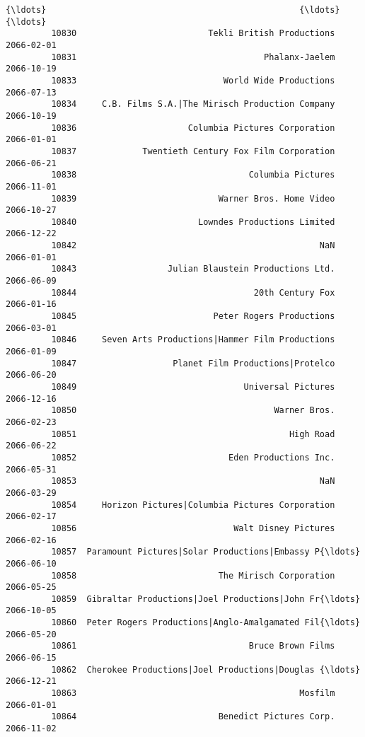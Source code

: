 \documentclass[11pt]{article}
\begin{document}
\begin{Verbatim}[commandchars=\\\{\}]
         {\ldots}                                                  {\ldots}          {\ldots}   
         10830                          Tekli British Productions   2066-02-01   
         10831                                     Phalanx-Jaelem   2066-10-19   
         10833                             World Wide Productions   2066-07-13   
         10834     C.B. Films S.A.|The Mirisch Production Company   2066-10-19   
         10836                      Columbia Pictures Corporation   2066-01-01   
         10837             Twentieth Century Fox Film Corporation   2066-06-21   
         10838                                  Columbia Pictures   2066-11-01   
         10839                            Warner Bros. Home Video   2066-10-27   
         10840                        Lowndes Productions Limited   2066-12-22   
         10842                                                NaN   2066-01-01   
         10843                  Julian Blaustein Productions Ltd.   2066-06-09   
         10844                                   20th Century Fox   2066-01-16   
         10845                           Peter Rogers Productions   2066-03-01   
         10846     Seven Arts Productions|Hammer Film Productions   2066-01-09   
         10847                   Planet Film Productions|Protelco   2066-06-20   
         10849                                 Universal Pictures   2066-12-16   
         10850                                       Warner Bros.   2066-02-23   
         10851                                          High Road   2066-06-22   
         10852                              Eden Productions Inc.   2066-05-31   
         10853                                                NaN   2066-03-29   
         10854     Horizon Pictures|Columbia Pictures Corporation   2066-02-17   
         10856                               Walt Disney Pictures   2066-02-16   
         10857  Paramount Pictures|Solar Productions|Embassy P{\ldots}   2066-06-10   
         10858                            The Mirisch Corporation   2066-05-25   
         10859  Gibraltar Productions|Joel Productions|John Fr{\ldots}   2066-10-05   
         10860  Peter Rogers Productions|Anglo-Amalgamated Fil{\ldots}   2066-05-20   
         10861                                  Bruce Brown Films   2066-06-15   
         10862  Cherokee Productions|Joel Productions|Douglas {\ldots}   2066-12-21   
         10863                                            Mosfilm   2066-01-01   
         10864                            Benedict Pictures Corp.   2066-11-02   
         

\end{Verbatim}
\end{document}

